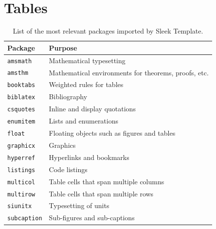 \documentclass[a4paper, 12pt]{report}
\begin{document}
    \printbibliography

    \appendix

    \chapter{Tables}

    \begin{table}[h]
        \centering
        \begin{tabular}{ll}
            \toprule
            \textbf{Package} & \textbf{Purpose} \\
            \midrule
            \texttt{amsmath} & Mathematical typesetting \\
            \texttt{amsthm} & Mathematical environments for theorems, proofs, etc. \\
            \texttt{booktabs} & Weighted rules for tables \\
            \texttt{biblatex} & Bibliography \\
            \texttt{csquotes} & Inline and display quotations \\
            \texttt{enumitem} & Lists and enumerations \\
            \texttt{float} & Floating objects such as figures and tables \\
            \texttt{graphicx} & Graphics \\
            \texttt{hyperref} & Hyperlinks and bookmarks \\
            \texttt{listings} & Code listings \\
            \texttt{multicol} & Table cells that span multiple columns \\
            \texttt{multirow} & Table cells that span multiple rows \\
            \texttt{siunitx} & Typesetting of units  \\
            \texttt{subcaption} & Sub-figures and sub-captions \\
            \bottomrule
        \end{tabular}
        \caption{List of the most relevant packages imported by Sleek Template.}
        \label{tab:sleek_relevant_packages}
    \end{table}
\end{document}

